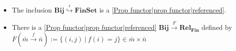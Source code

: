 
\begin{itemize}
    \item The inclusion $\mathbf{Bij} \overset{i}{\hookrightarrow} \mathbf{FinSet}$ is a \ref{Prop functor|prop functor|referenced}.
    \item There is a \ref{Prop functor|prop functor|referenced} $\mathbf{Bij} \xrightarrow F \mathbf{Rel_{Fin}}$ defined by $F(\bar{m} \xrightarrow{f} \bar{n}):=\{(i,j)\ |\ f(i)=j\} \in \bar m \times \bar n$
  \end{itemize}